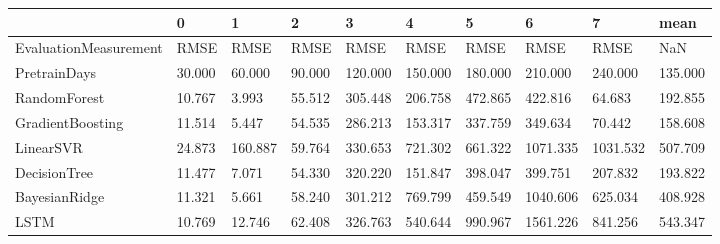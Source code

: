 \begin{tabular}{llllllllll}
\toprule
{} &      0 &       1 &      2 &       3 &       4 &       5 &        6 &        7 &    mean \\
\midrule
EvaluationMeasurement &   RMSE &    RMSE &   RMSE &    RMSE &    RMSE &    RMSE &     RMSE &     RMSE &     NaN \\
PretrainDays          & 30.000 &  60.000 & 90.000 & 120.000 & 150.000 & 180.000 &  210.000 &  240.000 & 135.000 \\
RandomForest          & 10.767 &   3.993 & 55.512 & 305.448 & 206.758 & 472.865 &  422.816 &   64.683 & 192.855 \\
GradientBoosting      & 11.514 &   5.447 & 54.535 & 286.213 & 153.317 & 337.759 &  349.634 &   70.442 & 158.608 \\
LinearSVR             & 24.873 & 160.887 & 59.764 & 330.653 & 721.302 & 661.322 & 1071.335 & 1031.532 & 507.709 \\
DecisionTree          & 11.477 &   7.071 & 54.330 & 320.220 & 151.847 & 398.047 &  399.751 &  207.832 & 193.822 \\
BayesianRidge         & 11.321 &   5.661 & 58.240 & 301.212 & 769.799 & 459.549 & 1040.606 &  625.034 & 408.928 \\
LSTM                  & 10.769 &  12.746 & 62.408 & 326.763 & 540.644 & 990.967 & 1561.226 &  841.256 & 543.347 \\
\bottomrule
\end{tabular}
